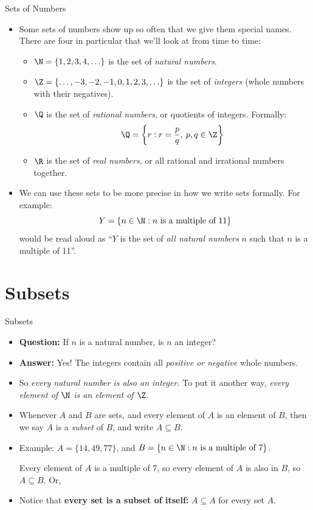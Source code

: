 \documentclass[11pt,aspectratio=1610]{beamer}
\begin{document}
\begin{frame}{Sets of Numbers}
	\begin{itemize}
		\item Some sets of numbers show up so often that we give them special names. \p There are four in particular that we'll look at from time to time: \p
		\begin{itemize}\itemsep2mm
			\item $\N = \{1,2,3,4,\ldots\}$ is the set of \emph{natural numbers}.\p
			\item $\Z = \{\ldots, -3, -2, -1, 0, 1, 2, 3, \ldots \}$ is the set of \emph{integers} (whole numbers with their negatives).\p
			\item $\Q$ is the set of \emph{rational numbers}, or quotients of integers. \p Formally: 
			\[
			\Q = \left\{ r : r = \frac p q, \: p, q \in \Z\right\}
			\]
			\item $\R$ is the set of \emph{real numbers}, or all rational and irrational numbers together. \p
		\end{itemize}
		\item We can use these sets to be more precise in how we write sets formally. For example: \p
		\[
		Y = \{n \in \N: n \textrm{ is a multiple of 11}\}
		\]\p
		would be read aloud as ``$Y$ is the set of \textit{all natural numbers} $n$ such that $n$ is a multiple of 11''. 
	\end{itemize}
\end{frame}

\section{Subsets}

\begin{frame}{Subsets}
	\begin{itemize}\itemsep4mm
		\item \textbf{Question:} If $n$ is a natural number, is $n$ an integer? \p 
		\item \textbf{Answer:} Yes! The integers contain all \emph{positive or negative} whole numbers. \p
		\item So \emph{every natural number is also an integer.} To put it another way, \emph{every element of $\N$ is an element of $\Z$.}\p
		\item Whenever $A$ and $B$ are sets, and every element of $A$ is an element of $B$, then we say $A$ is a \emph{subset} of $B$, and write $A \subseteq B$. \p
		\item Example: $A = \{14,49,77\}$, and $B = \{n \in \N: n \textrm{ is a multiple of 7}\}$. \p
		
		Every element of $A$ is a multiple of 7, so every element of $A$ is also in $B$, so $A \subseteq B$. \p Or, 
		\vspace{2mm}
		
		\item Notice that \textbf{every set is a subset of itself:} $A \subseteq A$ for every set $A$. 
	\end{itemize}
\end{frame}
\end{document}
